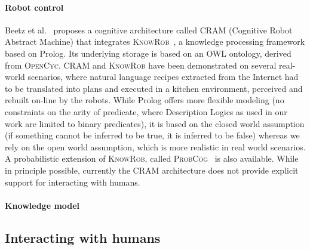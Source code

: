 \documentclass[preprint,5p]{elsarticle}
\begin{document}

\paragraph{Robot control}


Beetz et al.~\cite{Beetz2010} proposes a cognitive architecture called
\textsc{CRAM} (Cognitive Robot Abstract Machine) that integrates
\textsc{KnowRob}~\cite{Tenorth2009a}, a knowledge processing framework based on
Prolog. Its underlying storage is based on an OWL ontology, derived from
\textsc{OpenCyc}. \textsc{CRAM} and \textsc{KnowRob} have been demonstrated on
several real-world scenarios, where natural language recipes extracted from the
Internet had to be translated into plans and executed in a kitchen environment,
perceived and rebuilt on-line by the robots. While Prolog offers more flexible
modeling (no constraints on the arity of predicate, where Description Logics as
used in our work are limited to binary predicates), it is based on the closed
world assumption (if something cannot be inferred to be true, it is inferred to
be false) whereas we rely on the open world assumption, which is more realistic
in real world scenarios. A probabilistic extension of \textsc{KnowRob}, called
\textsc{ProbCog}~\cite{Jain2009} is also available. While in principle
possible, currently the CRAM architecture does not provide explicit support for
interacting with humans.


\paragraph{Knowledge model} 

\subsection{Interacting with humans}
\end{document}
